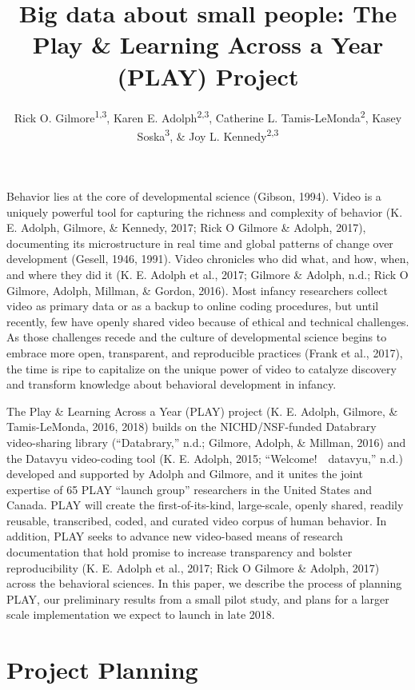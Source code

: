 \documentclass[english,man]{apa6}
\title{Big data about small people: The Play \& Learning Across a Year (PLAY)
Project}
\author{Rick O. Gilmore\textsuperscript{1,3}, Karen E. Adolph\textsuperscript{2,3}, Catherine L. Tamis-LeMonda\textsuperscript{2}, Kasey Soska\textsuperscript{3}, \& Joy L. Kennedy\textsuperscript{2,3}}
\affiliation{
    \vspace{0.5cm}
          \textsuperscript{1} The Pennsylvania State University\\
          \textsuperscript{2} New York University\\
          \textsuperscript{3} Databrary.org  }
\theoremstyle{definition}
\theoremstyle{definition}
\theoremstyle{definition}
\theoremstyle{remark}
\begin{document}
\maketitle

\setcounter{secnumdepth}{0}



Behavior lies at the core of developmental science (Gibson, 1994). Video
is a uniquely powerful tool for capturing the richness and complexity of
behavior (K. E. Adolph, Gilmore, \& Kennedy, 2017; Rick O Gilmore \&
Adolph, 2017), documenting its microstructure in real time and global
patterns of change over development (Gesell, 1946, 1991). Video
chronicles who did what, and how, when, and where they did it (K. E.
Adolph et al., 2017; Gilmore \& Adolph, n.d.; Rick O Gilmore, Adolph,
Millman, \& Gordon, 2016). Most infancy researchers collect video as
primary data or as a backup to online coding procedures, but until
recently, few have openly shared video because of ethical and technical
challenges. As those challenges recede and the culture of developmental
science begins to embrace more open, transparent, and reproducible
practices (Frank et al., 2017), the time is ripe to capitalize on the
unique power of video to catalyze discovery and transform knowledge
about behavioral development in infancy.

The Play \& Learning Across a Year (PLAY) project (K. E. Adolph,
Gilmore, \& Tamis-LeMonda, 2016, 2018) builds on the NICHD/NSF-funded
Databrary video-sharing library (``Databrary,'' n.d.; Gilmore, Adolph,
\& Millman, 2016) and the Datavyu video-coding tool (K. E. Adolph, 2015;
``Welcome!~\textbar{}\textbar{}~datavyu,'' n.d.) developed and supported
by Adolph and Gilmore, and it unites the joint expertise of 65 PLAY
\enquote{launch group} researchers in the United States and Canada. PLAY
will create the first-of-its-kind, large-scale, openly shared, readily
reusable, transcribed, coded, and curated video corpus of human
behavior. In addition, PLAY seeks to advance new video-based means of
research documentation that hold promise to increase transparency and
bolster reproducibility (K. E. Adolph et al., 2017; Rick O Gilmore \&
Adolph, 2017) across the behavioral sciences. In this paper, we describe
the process of planning PLAY, our preliminary results from a small pilot
study, and plans for a larger scale implementation we expect to launch
in late 2018.

\section{Project Planning}\label{project-planning}
\end{document}
